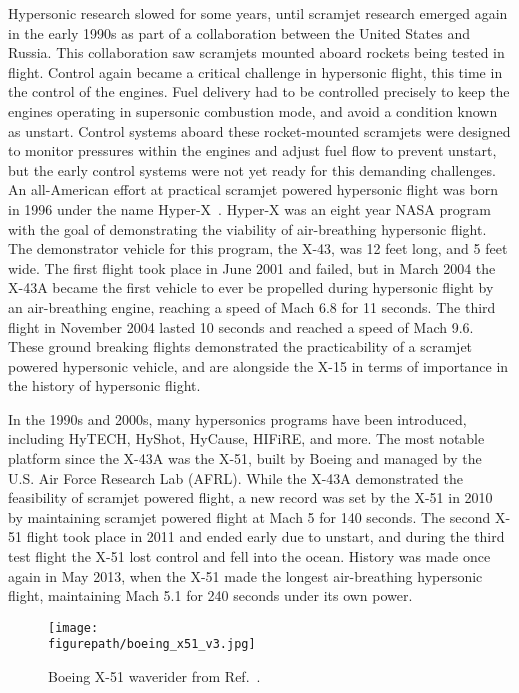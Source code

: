 Hypersonic research slowed for some years, until scramjet research emerged again in the early 1990s as part of a collaboration between the United States and Russia.
This collaboration saw scramjets mounted aboard rockets being tested in flight.
Control again became a critical challenge in hypersonic flight, this time in the control of the engines.
Fuel delivery had to be controlled precisely to keep the engines operating in supersonic combustion mode, and avoid a condition known as unstart.
Control systems aboard these rocket-mounted scramjets were designed to monitor pressures within the engines and adjust fuel flow to prevent unstart, but the early control systems were not yet ready for this demanding challenges.
An all-American effort at practical scramjet powered hypersonic flight was born in 1996 under the name Hyper-X\ \cite{freeman.hyperx.1997}.
Hyper-X was an eight year NASA program with the goal of demonstrating the viability of air-breathing hypersonic flight.
The demonstrator vehicle for this program, the X-43, was 12 feet long, and 5 feet wide.
The first flight took place in June 2001 and failed, but in March 2004 the X-43A became the first vehicle to ever be propelled during hypersonic flight by an air-breathing engine, reaching a speed of Mach 6.8 for 11 seconds.
The third flight in November 2004 lasted 10 seconds and reached a speed of Mach 9.6.
These ground breaking flights demonstrated the practicability of a scramjet powered hypersonic vehicle, and are alongside the X-15 in terms of importance in the history of hypersonic flight.

In the 1990s and 2000s, many hypersonics programs have been introduced, including HyTECH, HyShot, HyCause, HIFiRE, and more.
The most notable platform since the X-43A was the X-51, built by Boeing and managed by the U.S. Air Force Research Lab (AFRL).
While the X-43A demonstrated the feasibility of scramjet powered flight, a new record was set by the X-51 in 2010 by maintaining scramjet powered flight at Mach 5 for 140 seconds.
The second X-51 flight took place in 2011 and ended early due to unstart, and during the third test flight the X-51 lost control and fell into the ocean.
History was made once again in May 2013, when the X-51 made the longest air-breathing hypersonic flight, maintaining Mach 5.1 for 240 seconds under its own power.

\begin{figure}[h]
  \begin{center}
    \texttt{[image: \\figurepath/boeing\_x51\_v3.jpg]}
    \caption{Boeing X-51 waverider from Ref.\ \cite{x51picture}.}
  \end{center}
\end{figure}

